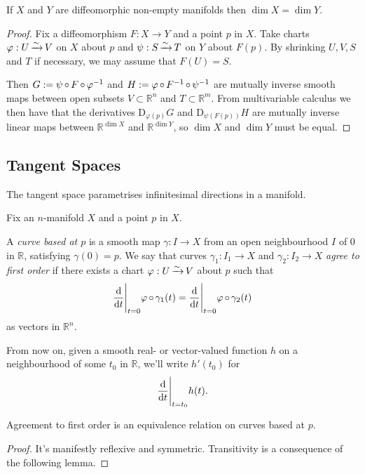 \documentclass[a4paper,11pt]{article}
\begin{document}
	\begin{lem}
		If $X$ and $Y$ are diffeomorphic non-empty manifolds then $\dim X = \dim Y$.
	\end{lem}
	\begin{proof}
		Fix a diffeomorphism $F : X \to Y$ and a point $p$ in $X$. Take charts $\varphi : U \operatorname{\xrightarrow{\sim}} V$ on $X$ about $p$ and $\psi : S \operatorname{\xrightarrow{\sim}} T$ on $Y$ about $F(p)$. By shrinking $U,V,S$ and $T$ if necessary, we may assume that $F(U)=S$.
		
		Then $G: = \psi \operatorname{\circ} F \operatorname{\circ} \varphi^{-1}$ and $H := \varphi \operatorname{\circ} F^{-1} \operatorname{\circ} \psi^{-1}$ are mutually inverse smooth maps between open subsets $V \subset \mathbb{R}^n$ and $T \subset \mathbb{R}^m$. From multivariable calculus we then have that the derivatives $\mathrm{D}_{\varphi(p)}G$ and $\mathrm{D}_{\psi(F(p))} H$ are mutually inverse linear maps between $\mathbb{R}^{\dim X}$ and $\mathbb{R}^{\dim Y}$, so $\dim X$ and $\dim Y$ must be equal.
	\end{proof}

	\subsection{Tangent Spaces} 
	
	The tangent space parametrises infinitesimal directions in a manifold.

	Fix an $n$-manifold $X$ and a point $p$ in $X$.

	\begin{defi}
		A \emph{curve based at $p$} is a smooth map $\gamma : I \to X$ from an open neighbourhood $I$ of $0$ in $\mathbb{R}$, satisfying $\gamma(0) = p$. We say that curves $\gamma_1 : I_1 \to X$ and $\gamma_2 : I_2 \to X$ \emph{agree to first order} if there exists a chart $\varphi : U \operatorname{\xrightarrow{\sim}} V$ about $p$ such that 
		\[
			\dv{t}\Bigg|_{t=0} \varphi \operatorname{\circ} \gamma_1(t) = \dv{t}\Bigg|_{t=0} \varphi \operatorname{\circ} \gamma_2 (t)
		\]
		as vectors in $\mathbb{R}^n$.
	\end{defi}

	From now on, given a smooth real- or vector-valued function $h$ on a neighbourhood of some $t_0$ in $\mathbb{R}$, we'll write $h'(t_0)$ for
	\[
		\dv{t}\Bigg|_{t = t_0} h(t).
	\]
	
	\begin{prop}
		Agreement to first order is an equivalence relation on curves based at $p$.
	\end{prop}

	\begin{proof}
		It's manifestly reflexive and symmetric. Transitivity is a consequence of the following lemma.
	\end{proof}
\end{document}
